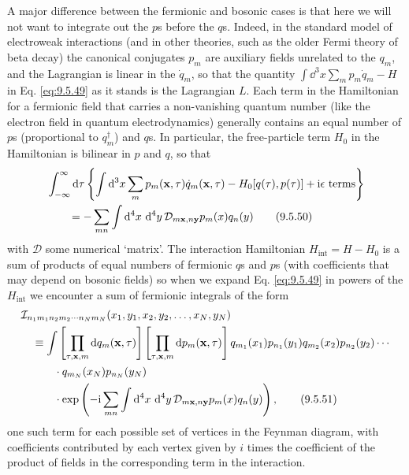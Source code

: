 A major difference between the fermionic and bosonic cases is that here we
will not want to integrate out the $p$s before the $q$s. Indeed, in the
standard model of electroweak interactions (and in other theories, such as the
older Fermi theory of beta decay) the canonical conjugates $p_m$ are auxiliary
fields unrelated to the $q_m$, and the Lagrangian is linear in the $\dot q_m$,
so that the quantity $\int \dd^3x\sum_mp_m\dot q_m-H$ in Eq. \eqref{eq:9.5.49} as it
stands is the Lagrangian $L$. Each term in the Hamiltonian for a fermionic
field that carries a non-vanishing quantum number (like the electron field in
quantum electrodynamics) generally contains an equal number of $p$s
(proportional to $q_m^\dagger$) and $q$s. In particular, the free-particle term
$H_0$ in the Hamiltonian is bilinear in $p$ and $q$, so that
\begin{align}
&\int_{-\infty}^{\infty}\mathop{}\!\mathrm{d}\tau
 \left\{\int \mathop{}\!\mathrm{d}^3x\sum_mp_m(\mathbf{x},\tau)\dot q_m(\mathbf{x},\tau)
 -H_0[q(\tau),p(\tau)]+\mathrm{i}\epsilon\text{ terms}\right\}
\notag\\
&\qquad=-\sum_{mn}\int \mathop{}\!\mathrm{d}^4x\,\mathop{}\!\mathrm{d}^4y\,
 \mathcal{D}_{m\mathbf{x},n\mathbf{y}}p_m(x)q_n(y)
\tag{9.5.50}\label{eq:9.5.50}
\end{align}
with $\mathcal{D}$ some numerical `matrix'. The interaction Hamiltonian
$H_{\mathrm{int}}=H-H_0$ is a sum of products of equal numbers of fermionic
$q$s and $p$s (with coefficients that may depend on bosonic fields) so when we
expand Eq. \eqref{eq:9.5.49} in powers of the $H_{\mathrm{int}}$ we encounter a sum of
fermionic integrals of the form
\begin{align}
&\mathcal{I}_{n_1m_1n_2m_2\cdots n_Nm_N}
 (x_1,y_1,x_2,y_2,\ldots,x_N,y_N)
\notag\\
&\quad\equiv\int
 \left[\prod_{\tau,\mathbf{x},m}\mathop{}\!\mathrm{d} q_m(\mathbf{x},\tau)\right]
 \left[\prod_{\tau,\mathbf{x},m}\mathop{}\!\mathrm{d} p_m(\mathbf{x},\tau)\right]
 q_{m_1}(x_1)p_{n_1}(y_1)q_{m_2}(x_2)p_{n_2}(y_2)\cdots
\notag\\
&\qquad\quad\cdot q_{m_N}(x_N)p_{n_N}(y_N)
\notag\\
&\qquad\quad\cdot
 \exp\left(-\mathrm{i}\sum_{mn}\int \mathop{}\!\mathrm{d}^4x\,\mathop{}\!\mathrm{d}^4y\,
 \mathcal{D}_{m\mathbf{x},n\mathbf{y}}p_m(x)q_n(y)\right),
\tag{9.5.51}\label{eq:9.5.51}
\end{align}
one such term for each possible set of vertices in the Feynman diagram, with
coefficients contributed by each vertex given by $i$ times the coefficient of
the product of fields in the corresponding term in the interaction.


